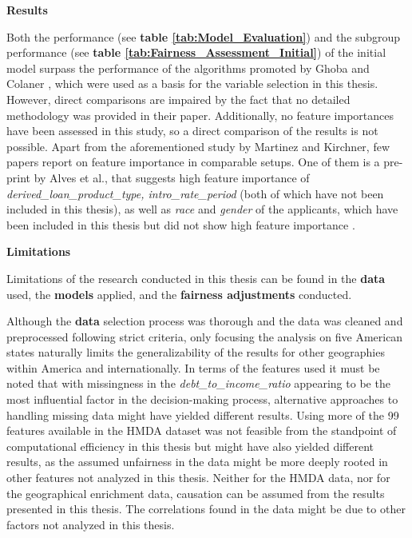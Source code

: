 


\textbf{Results}

Both the performance (see \textbf{table \ref{tab:Model_Evaluation}}) and the subgroup performance (see \textbf{table \ref{tab:Fairness_Assessment_Initial}}) of the initial model surpass the performance of the algorithms promoted by Ghoba and Colaner \parencite{Ghoba}, which were used as a basis for the variable selection in this thesis. However, direct comparisons are impaired by the fact that no detailed methodology was provided in their paper.
Additionally, no feature importances have been assessed in this study, so a direct comparison of the results is not possible. Apart from the aforementioned study by Martinez and Kirchner, few papers report on feature importance in comparable setups. 
One of them is a pre-print by Alves et al., that suggests high feature importance of \textit{derived\_loan\_product\_type, intro\_rate\_period} (both of which have not been included in this thesis), as well as \textit{race} and \textit{gender} of the applicants, which have been included in this thesis but did not show high feature importance \parencite{alves:hal-03033181}.




\textbf{Limitations}

Limitations of the research conducted in this thesis can be found in the \textbf{data} used, the \textbf{models} applied, and the \textbf{fairness adjustments} conducted.

Although the \textbf{data} selection process was thorough and the data was cleaned and preprocessed following strict criteria, only focusing the analysis on five American states naturally limits the generalizability of the results for other geographies within America and internationally.
In terms of the features used it must be noted that with missingness in the \textit{debt\_to\_income\_ratio} appearing to be the most influential factor in the decision-making process, alternative approaches to handling missing data might have yielded different results.
Using more of the 99 features available in the HMDA dataset was not feasible from the standpoint of computational efficiency in this thesis but might have also yielded different results, as the assumed unfairness in the data might be more deeply rooted in other features not analyzed in this thesis.
Neither for the HMDA data, nor for the geographical enrichment data, causation can be assumed from the results presented in this thesis. The correlations found in the data might be due to other factors not analyzed in this thesis.

